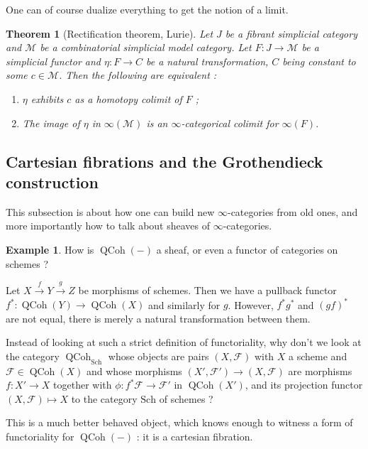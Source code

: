 \documentclass[11pt]{article}
\newtheorem{theorem}{Theorem}
\theoremstyle{definition}
\newtheorem{example}{Example}
\newcommand{\M}{\mathscr{M}}
\DeclareMathOperator{\QCoh}{QCoh}
\begin{document}
One can of course dualize everything to get the notion of a limit.

\begin{theorem}[Rectification theorem, Lurie]
    Let $J$ be a fibrant simplicial category and $\M$ be a combinatorial simplicial model category. Let $F : J \to \M$ be a simplicial functor and $\eta : F \to C$ be a natural transformation, $C$ being constant to some $c \in \M$. Then the following are equivalent :
    \begin{enumerate}
        \item $\eta$ exhibits $c$ as a homotopy colimit of $F$ ;
        \item The image of $\eta$ in $\infty(\M)$ is an $\infty$-categorical colimit for $\infty(F)$.
    \end{enumerate}
\end{theorem}

\subsection{Cartesian fibrations and the Grothendieck construction}

This subsection is about how one can build new $\infty$-categories from old ones, and more importantly how to talk about sheaves of $\infty$-categories.

\begin{example}
    How is $\QCoh(-)$ a sheaf, or even a functor of categories on schemes ?

    Let $X \xrightarrow{f} Y \xrightarrow{g} Z$ be morphisms of schemes. Then we have a pullback functor $f^* : \QCoh(Y) \to \QCoh(X)$ and similarly for $g$. However, $f^*g^*$ and $(gf)^*$ are not equal, there is merely a natural transformation between them.

    Instead of looking at such a strict definition of functoriality, why don't we look at the category $\QCoh_{\mathrm{Sch}}$ whose objects are pairs $(X, \mathcal{F})$ with $X$ a scheme and $\mathcal{F} \in \QCoh(X)$ and whose morphisms $(X', \mathcal{F}') \to (X, \mathcal{F})$ are morphisms $f : X' \to X$ together with $\phi : f^*\mathcal{F} \to \mathcal{F}'$ in $\QCoh(X')$, and its projection functor $(X, \mathcal{F}) \mapsto X$ to the category $\mathrm{Sch}$ of schemes ?

    This is a much better behaved object, which knows enough to witness a form of functoriality for $\QCoh(-)$ : it is a cartesian fibration.
\end{example}
\end{document}
